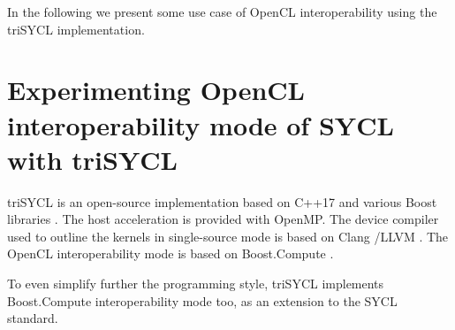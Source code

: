 \documentclass[sigplan, review, authordraft]{acmart}
\begin{document}
In the following we present some use case of OpenCL interoperability
using the triSYCL implementation.


\section{Experimenting OpenCL interoperability mode of SYCL with
  triSYCL}
\label{sec:exper-with-opencl}

triSYCL \cite{triSYCL} is an open-source implementation based on C++17
and various Boost libraries \cite{Boost-1.63}. The host acceleration
is provided with OpenMP. The device compiler used to outline the
kernels in single-source mode is based on Clang \cite{Clang-4.0}/LLVM
\cite{LLVM-4.0}. The OpenCL interoperability mode is based on
Boost.Compute \cite{Boost.Compute}.

To even simplify further the programming style, triSYCL
implements Boost.Compute interoperability mode too, as an extension to
the SYCL standard.
\end{document}
